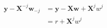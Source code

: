 \newcommand{\matrix}[1]{\mathbf{#1}}
\newcommand{\vector}[1]{\mathbf{#1}}
\newcommand{\X}{\matrix{X}}
\newcommand{\y}{\vector{y}}
\newcommand{\w}{\vector{w}}
\newcommand{\r}{\vector{r}}
\begin{align*}
\y - \X^{-j} \w_{-j} &= \y - \X \w + \X^j w^j \\
&= r + \X^j w^j \\
\end{align*}
